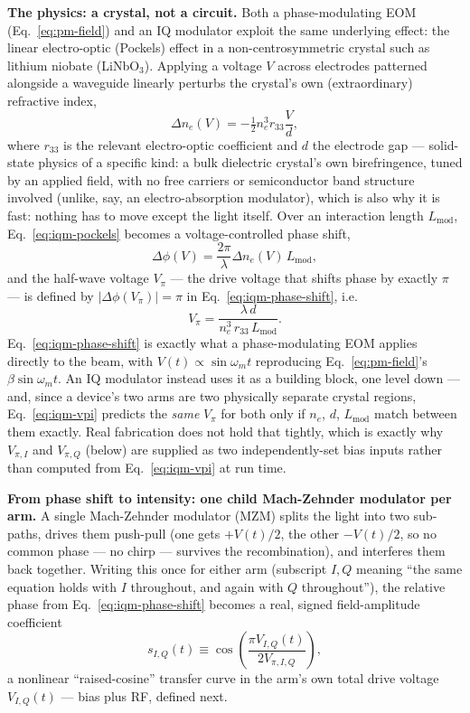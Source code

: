 \documentclass[9pt]{article}
\begin{document}
\textbf{The physics: a crystal, not a circuit.} Both a phase-modulating EOM
(Eq.~\eqref{eq:pm-field}) and an IQ modulator exploit the same underlying
effect: the linear electro-optic (Pockels) effect in a non-centrosymmetric
crystal such as lithium niobate (LiNbO$_3$). Applying a voltage $V$ across
electrodes patterned alongside a waveguide linearly perturbs the crystal's
own (extraordinary) refractive index,
\begin{equation}
\Delta n_e(V) = -\tfrac{1}{2}n_e^3 r_{33}\frac{V}{d},
\label{eq:iqm-pockels}
\end{equation}
where $r_{33}$ is the relevant electro-optic coefficient and $d$ the
electrode gap --- solid-state physics of a specific kind: a bulk dielectric
crystal's own birefringence, tuned by an applied field, with no free
carriers or semiconductor band structure involved (unlike, say, an
electro-absorption modulator), which is also why it is fast: nothing has to
move except the light itself. Over an interaction length $L_{\mathrm{mod}}$,
Eq.~\eqref{eq:iqm-pockels} becomes a voltage-controlled phase shift,
\begin{equation}
\Delta\phi(V) = \frac{2\pi}{\lambda}\Delta n_e(V)\,L_{\mathrm{mod}},
\label{eq:iqm-phase-shift}
\end{equation}
and the half-wave voltage $V_\pi$ --- the drive voltage that shifts phase by
exactly $\pi$ --- is defined by $|\Delta\phi(V_\pi)|=\pi$ in
Eq.~\eqref{eq:iqm-phase-shift}, i.e.
\begin{equation}
V_\pi = \frac{\lambda\,d}{n_e^3\,r_{33}\,L_{\mathrm{mod}}}.
\label{eq:iqm-vpi}
\end{equation}
Eq.~\eqref{eq:iqm-phase-shift} is exactly what a phase-modulating EOM
applies directly to the beam, with $V(t)\propto\sin\omega_m t$ reproducing
Eq.~\eqref{eq:pm-field}'s $\beta\sin\omega_m t$. An IQ modulator instead uses
it as a building block, one level down --- and, since a device's two arms
are two physically separate crystal regions, Eq.~\eqref{eq:iqm-vpi} predicts
the \emph{same} $V_\pi$ for both only if $n_e$, $d$, $L_{\mathrm{mod}}$
match between them exactly. Real fabrication does not hold that tightly,
which is exactly why $V_{\pi,I}$ and $V_{\pi,Q}$ (below) are supplied as two
independently-set bias inputs rather than computed from
Eq.~\eqref{eq:iqm-vpi} at run time.

\textbf{From phase shift to intensity: one child Mach-Zehnder modulator per
arm.} A single Mach-Zehnder modulator (MZM) splits the light into two
sub-paths, drives them push-pull (one gets $+V(t)/2$, the other $-V(t)/2$,
so no common phase --- no chirp --- survives the recombination), and
interferes them back together. Writing this once for either arm (subscript
$I,Q$ meaning ``the same equation holds with $I$ throughout, and again with
$Q$ throughout''), the relative phase from Eq.~\eqref{eq:iqm-phase-shift}
becomes a real, signed field-amplitude coefficient
\begin{equation}
s_{I,Q}(t) \equiv \cos\!\left(\frac{\pi V_{I,Q}(t)}{2V_{\pi,I,Q}}\right),
\label{eq:iqm-mzm-transfer}
\end{equation}
a nonlinear ``raised-cosine'' transfer curve in the arm's own total drive
voltage $V_{I,Q}(t)$ --- bias plus RF, defined next.
\end{document}
